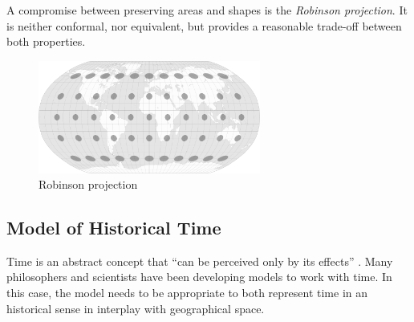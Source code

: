 \addtocounter{footnote}{1} %

A compromise between preserving areas and shapes is the \emph{Robinson projection}. It is neither conformal, nor equivalent, but provides a reasonable trade-off between both properties.

\begin{figure}[ht]
  \centering
  \includegraphics[width=0.65\textwidth]{graphics/basics/projection_distortion_robinson.png}
  \caption{Robinson projection \protect\footnotemark}
  \label{fig:robinson_projection}
\end{figure}






\subsection{Model of Historical Time} %
\label{sub:model_of_historical_time}

Time is an abstract concept that ``can be perceived only by its effects''
\cite[p. 27]{Langran1989timeingis}.
Many philosophers and scientists have been developing models to work with time. In this case, the model needs to be appropriate to both represent time in an historical sense in interplay with geographical space.


